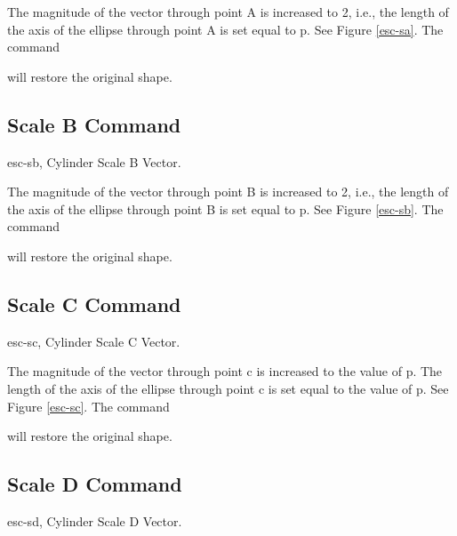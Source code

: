 The magnitude of the vector through point A is increased to 2, i.e.,
the length of the axis of the ellipse through point A is set equal to p.
See Figure \ref{esc-sa}.  The command


will restore the original shape.

\subsection{Scale B Command}
\mfig esc-sb, Cylinder Scale B Vector.


The magnitude of the vector through point B is increased to 2, i.e.,
the length of the axis of the ellipse through point B is set equal to p.
See Figure \ref{esc-sb}.  The command


will restore the original shape.

\subsection{Scale C Command}
\mfig esc-sc, Cylinder Scale C Vector.


The magnitude of the vector through point c is increased to the value of
p.  The length of the axis of the ellipse through point c is set equal to the
value of p.  See Figure \ref{esc-sc}.  The command


will restore the original shape.

\subsection{Scale D Command}
\mfig esc-sd, Cylinder Scale D Vector.


